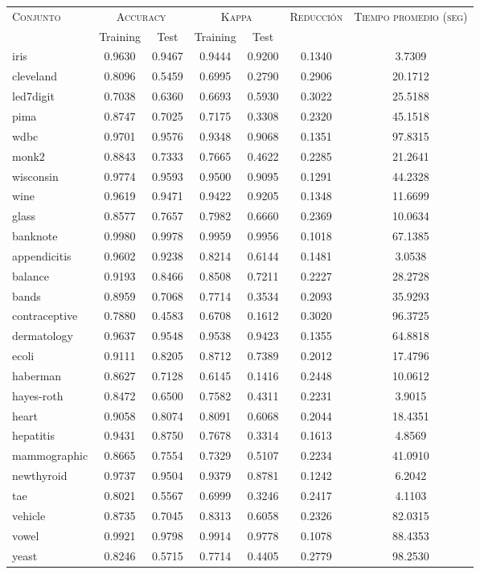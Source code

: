 \begin{table}[]
\centering
\begin{tabular}{l c c c c c c}
\hline
\multirow{2}{*}{\textsc{Conjunto}}
	& \multicolumn{2}{c}{\textsc{Accuracy}}
	& \multicolumn{2}{c}{\textsc{Kappa}}
	& \textsc{Reducción}
	& \textsc{Tiempo promedio (seg)} \\
	& Training & Test
	& Training & Test \\ 
\hline
\hline

iris & 0.9630 & 0.9467 & 0.9444 & 0.9200 & 0.1340 & 3.7309 \\
cleveland & 0.8096 & 0.5459 & 0.6995 & 0.2790 & 0.2906 & 20.1712 \\
led7digit & 0.7038 & 0.6360 & 0.6693 & 0.5930 & 0.3022 &  25.5188 \\
pima & 0.8747 & 0.7025 & 0.7175 & 0.3308 & 0.2320 &  45.1518 \\
wdbc & 0.9701 & 0.9576 & 0.9348 & 0.9068 & 0.1351 &  97.8315 \\
monk2 & 0.8843 & 0.7333 & 0.7665 & 0.4622 & 0.2285 & 21.2641 \\
wisconsin & 0.9774 & 0.9593 & 0.9500 & 0.9095 & 0.1291 &  44.2328 \\
wine & 0.9619 & 0.9471 & 0.9422 & 0.9205 & 0.1348 & 11.6699 \\
glass & 0.8577 & 0.7657 & 0.7982 & 0.6660 & 0.2369 & 10.0634 \\
banknote & 0.9980 & 0.9978 & 0.9959 & 0.9956 & 0.1018 &  67.1385 \\
appendicitis & 0.9602 & 0.9238 & 0.8214 & 0.6144 & 0.1481 & 3.0538 \\
balance & 0.9193 & 0.8466 & 0.8508 & 0.7211 & 0.2227 &  28.2728 \\
bands & 0.8959 & 0.7068 & 0.7714 & 0.3534 & 0.2093 &  35.9293 \\
contraceptive & 0.7880 & 0.4583 & 0.6708 & 0.1612 & 0.3020 &  96.3725 \\
dermatology & 0.9637 & 0.9548 & 0.9538 & 0.9423 & 0.1355 &  64.8818 \\
ecoli & 0.9111 & 0.8205 & 0.8712 & 0.7389 & 0.2012 & 17.4796 \\
haberman & 0.8627 & 0.7128 & 0.6145 & 0.1416 & 0.2448 & 10.0612 \\
hayes-roth & 0.8472 & 0.6500 & 0.7582 & 0.4311 & 0.2231 & 3.9015 \\
heart & 0.9058 & 0.8074 & 0.8091 & 0.6068 & 0.2044 & 18.4351 \\
hepatitis & 0.9431 & 0.8750 & 0.7678 & 0.3314 & 0.1613 & 4.8569 \\
mammographic & 0.8665 & 0.7554 & 0.7329 & 0.5107 & 0.2234 &  41.0910 \\
newthyroid & 0.9737 & 0.9504 & 0.9379 & 0.8781 & 0.1242 & 6.2042 \\
tae & 0.8021 & 0.5567 & 0.6999 & 0.3246 & 0.2417 & 4.1103 \\
vehicle & 0.8735 & 0.7045 & 0.8313 & 0.6058 & 0.2326 &  82.0315 \\
vowel & 0.9921 & 0.9798 & 0.9914 & 0.9778 & 0.1078 &  88.4353 \\
yeast & 0.8246 & 0.5715 & 0.7714 & 0.4405 & 0.2779 &  98.2530 \\


\end{tabular}
\end{table}

